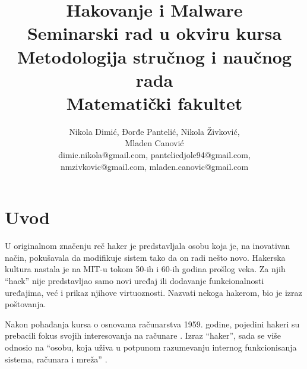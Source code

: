 \documentclass[a4paper]{article}
\begin{document}
\title{Hakovanje i Malware\\ \small{Seminarski rad u okviru kursa\\Metodologija stručnog i naučnog rada\\ Matematički fakultet}}

\author{Nikola Dimić, Đorđe Pantelić, Nikola Živković,\\Mladen Canović\\ dimic.nikola@gmail.com, pantelicdjole94@gmail.com,\\nmzivkovic@gmail.com, mladen.canovic@gmail.com}


\maketitle


\setcounter{tocdepth}{2}
\tableofcontents

\newpage

\section{Uvod}
\label{sec:uvod}
U originalnom značenju reč haker je predstavljala osobu koja je, na inovativan način, pokušavala da modifikuje sistem tako da on radi nešto novo. Hakerska kultura nastala je na MIT-u tokom 50-ih i 60-ih godina prošlog veka. Za njih “hack” nije predstavljao samo novi uređaj ili dodavanje funkcionalnosti uređajima, već i prikaz njihove virtuoznosti. Nazvati nekoga hakerom, bio je izraz poštovanja.

Nakon pohađanja kursa o osnovama računarstva 1959. godine, pojedini hakeri su prebacili fokus svojih interesovanja na računare \cite{hackers_heroes}. Izraz “haker”, sada se više odnosio na “osobu, koja uživa u potpunom razumevanju internog funkcionisanja sistema, računara i mreža” \cite{hacker_definition}.
\end{document}
